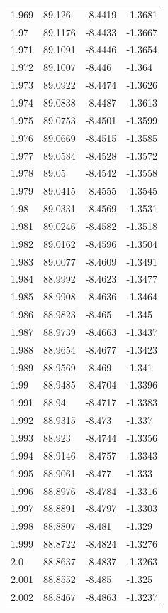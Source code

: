 \begin{tabular}{llll}
1.969 & 89.126 & -8.4419 & -1.3681 \\
1.97 & 89.1176 & -8.4433 & -1.3667 \\
1.971 & 89.1091 & -8.4446 & -1.3654 \\
1.972 & 89.1007 & -8.446 & -1.364 \\
1.973 & 89.0922 & -8.4474 & -1.3626 \\
1.974 & 89.0838 & -8.4487 & -1.3613 \\
1.975 & 89.0753 & -8.4501 & -1.3599 \\
1.976 & 89.0669 & -8.4515 & -1.3585 \\
1.977 & 89.0584 & -8.4528 & -1.3572 \\
1.978 & 89.05 & -8.4542 & -1.3558 \\
1.979 & 89.0415 & -8.4555 & -1.3545 \\
1.98 & 89.0331 & -8.4569 & -1.3531 \\
1.981 & 89.0246 & -8.4582 & -1.3518 \\
1.982 & 89.0162 & -8.4596 & -1.3504 \\
1.983 & 89.0077 & -8.4609 & -1.3491 \\
1.984 & 88.9992 & -8.4623 & -1.3477 \\
1.985 & 88.9908 & -8.4636 & -1.3464 \\
1.986 & 88.9823 & -8.465 & -1.345 \\
1.987 & 88.9739 & -8.4663 & -1.3437 \\
1.988 & 88.9654 & -8.4677 & -1.3423 \\
1.989 & 88.9569 & -8.469 & -1.341 \\
1.99 & 88.9485 & -8.4704 & -1.3396 \\
1.991 & 88.94 & -8.4717 & -1.3383 \\
1.992 & 88.9315 & -8.473 & -1.337 \\
1.993 & 88.923 & -8.4744 & -1.3356 \\
1.994 & 88.9146 & -8.4757 & -1.3343 \\
1.995 & 88.9061 & -8.477 & -1.333 \\
1.996 & 88.8976 & -8.4784 & -1.3316 \\
1.997 & 88.8891 & -8.4797 & -1.3303 \\
1.998 & 88.8807 & -8.481 & -1.329 \\
1.999 & 88.8722 & -8.4824 & -1.3276 \\
2.0 & 88.8637 & -8.4837 & -1.3263 \\
2.001 & 88.8552 & -8.485 & -1.325 \\
2.002 & 88.8467 & -8.4863 & -1.3237 \\

\end{tabular}
